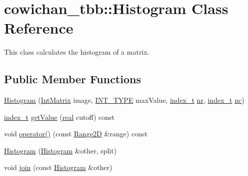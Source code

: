 \hypertarget{classcowichan__tbb_1_1_histogram}{
\section{cowichan\_\-tbb::Histogram Class Reference}
\label{classcowichan__tbb_1_1_histogram}
}
This class calculates the histogram of a matrix.  


\subsection*{Public Member Functions}
\begin{CompactItemize}
\item 
\hyperlink{classcowichan__tbb_1_1_histogram_2a8e6b95c2a1ec48465550dbba3cabde}{Histogram} (\hyperlink{cowichan_8hpp_82321152ddeeefe9c61350a42ed9e7af}{IntMatrix} image, \hyperlink{cowichan_8hpp_c96945095fd0ce7186a1d00a89f77d2c}{INT\_\-TYPE} maxValue, \hyperlink{cowichan_8hpp_5b04577d5d21124855deaad298595371}{index\_\-t} \hyperlink{classcowichan__tbb_1_1_histogram_aceebcf710541cd82d3d9d8fcef243cc}{nr}, \hyperlink{cowichan_8hpp_5b04577d5d21124855deaad298595371}{index\_\-t} \hyperlink{classcowichan__tbb_1_1_histogram_20345a7d3c1bc558e4b892681549bfda}{nc})
\item 
\hyperlink{cowichan_8hpp_5b04577d5d21124855deaad298595371}{index\_\-t} \hyperlink{classcowichan__tbb_1_1_histogram_0eb04715e3b5fb8b18fe73220aad5f34}{getValue} (\hyperlink{cowichan_8hpp_4d521b2c54a1f6312cc8fa04827eaf98}{real} cutoff) const 
\item 
void \hyperlink{classcowichan__tbb_1_1_histogram_eafa033db597cbe0e7d23f49ca628c85}{operator()} (const \hyperlink{cowichan__tbb_8hpp_e591b8e6980ddc5982ee22655da2ab8e}{Range2D} \&range) const 
\item 
\hyperlink{classcowichan__tbb_1_1_histogram_67d7da06d8e4390c3a1189f6e437513d}{Histogram} (\hyperlink{classcowichan__tbb_1_1_histogram}{Histogram} \&other, split)
\item 
void \hyperlink{classcowichan__tbb_1_1_histogram_6be59f34ceb9be23e8f8f9e952a5bfc5}{join} (const \hyperlink{classcowichan__tbb_1_1_histogram}{Histogram} \&other)
\end{CompactItemize}
